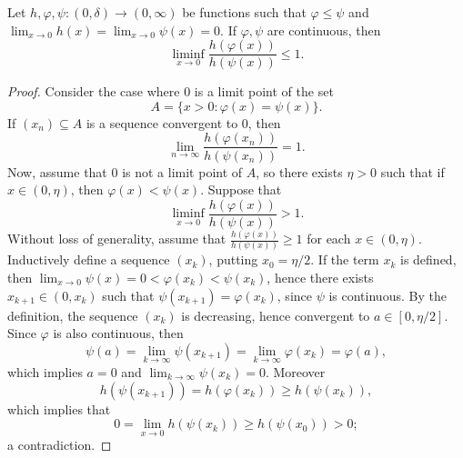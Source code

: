 \documentclass[10pt,a4paper]{amsart}
\renewcommand{\geq}{\geqslant}
\renewcommand{\leq}{\leqslant}
\renewcommand{\phi}{\varphi}
\begin{document}
\begin{lem}\label{lem:1}
  Let  $h,\phi,\psi\colon(0,\delta)\to(0,\infty)$ be functions such that  $\phi\leq\psi$ and $\lim_{x\to 0}h(x)=\lim_{x\to 0}\psi(x)=0$.
  If $\phi,\psi$ are continuous, then
  $$\liminf_{x\to 0}\frac{h(\phi(x))}{h(\psi(x))}\leq 1.$$
\end{lem}

\begin{proof}
  Consider the case where  $0$ is a limit point of the set
  $$A=\{x>0\colon \phi(x)=\psi(x)\}.$$
If $(x_n)\subseteq A$ is a sequence convergent to $0$, then
  $$\lim_{n\to\infty}\frac{h(\phi(x_n))}{h(\psi(x_n))}=1.$$
Now, assume that $0$ is not a limit point of  $A$, so there exists  $\eta>0$ such that if $x\in(0,\eta)$, then $\phi(x)<\psi(x)$.
  Suppose that
  $$\liminf_{x\to 0}\frac{h(\phi(x))}{h(\psi(x))}>1.$$
Without loss of generality,  assume that  $\frac{h(\phi(x))}{h(\psi(x))}\geq 1$ for each $x\in(0,\eta)$.
Inductively  define a sequence $(x_k)$, putting  $x_0=\eta/2$.
  If the term $x_k$ is defined, then   $\lim_{x\to0}\psi(x)=0<\phi(x_k)<\psi(x_k)$, hence there exists  $x_{k+1}\in(0,x_k)$ such that $\psi(x_{k+1})=\phi(x_k)$, since $\psi$ is continuous.
By the definition, the sequence $(x_k)$ is decreasing, hence convergent to   $a\in[0,\eta/2]$.
 Since $\phi$ is also continuous, then 
  $$\psi(a)=\lim_{k\to\infty}\psi(x_{k+1})=\lim_{k\to\infty}\phi(x_k)=\phi(a),$$
which implies $a=0$ and $\lim_{k\to\infty}\psi(x_k)=0$.
  Moreover
  $$h(\psi(x_{k+1}))=h(\phi(x_k))\geq h(\psi(x_k)),$$
  which implies that
  $$0=\lim_{x\to 0}h(\psi(x_k))\geq h(\psi(x_0))>0;$$
  a contradiction.
\end{proof}
\end{document}

